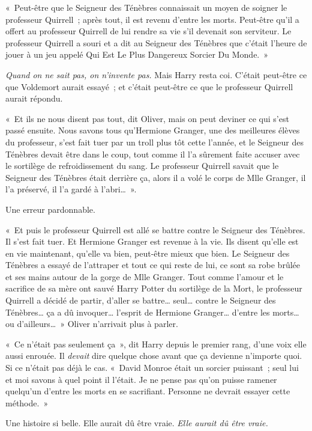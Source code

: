 «~Peut-être que le Seigneur des Ténèbres connaissait un moyen de soigner le professeur Quirrell~; après tout, il est revenu d'entre les morts.
Peut-être qu'il a offert au professeur Quirrell de lui rendre sa vie s'il devenait son serviteur.
Le professeur Quirrell a souri et a dit au Seigneur des Ténèbres que c'était l'heure de jouer à un jeu appelé Qui Est Le Plus Dangereux Sorcier Du Monde.~»

\emph{Quand on ne sait pas, on n'invente pas.} Mais Harry resta coi.
C'était peut-être ce que Voldemort aurait essayé~; et c'était peut-être ce que le professeur Quirrell aurait répondu.

«~Et ils ne nous disent pas tout, dit Oliver, mais on peut deviner ce qui s'est passé ensuite.
Nous savons tous qu'Hermione Granger, une des meilleures élèves du professeur, s'est fait tuer par un troll plus tôt cette l'année, et le Seigneur des Ténèbres devait être dans le coup, tout comme il l'a sûrement faite accuser avec le sortilège de refroidissement du sang.
Le professeur Quirrell savait que le Seigneur des Ténèbres était derrière ça, alors il a volé le corps de Mlle Granger, il l'a préservé, il l'a gardé à l'abri…~».

Une erreur pardonnable.

«~Et puis le professeur Quirrell est allé se battre contre le Seigneur des Ténèbres.
Il s'est fait tuer.
Et Hermione Granger est revenue à la vie.
Ils disent qu'elle est en vie maintenant, qu'elle va bien, peut-être mieux que bien.
Le Seigneur des Ténèbres a essayé de l'attraper et tout ce qui reste de lui, ce sont sa robe brûlée et ses mains autour de la gorge de Mlle Granger.
Tout comme l'amour et le sacrifice de sa mère ont sauvé Harry Potter du sortilège de la Mort, le professeur Quirrell a décidé de partir, d'aller se battre… seul… contre le Seigneur des Ténèbres… ça a dû invoquer… l'esprit de Hermione Granger… d'entre les morts… ou d'ailleurs…~»
Oliver n'arrivait plus à parler.

«~Ce n'était pas seulement ça~», dit Harry depuis le premier rang, d'une voix elle aussi enrouée.
Il \emph{devait} dire quelque chose avant que ça devienne n'importe quoi.
Si ce n'était pas déjà le cas.
«~David Monroe était un sorcier puissant~; seul lui et moi savons à quel point il l'était.
Je ne pense pas qu'on puisse ramener quelqu'un d'entre les morts en se sacrifiant.
Personne ne devrait essayer cette méthode.~»

Une histoire si belle.
Elle aurait dû être vraie.
\emph{Elle aurait dû être vraie.}

